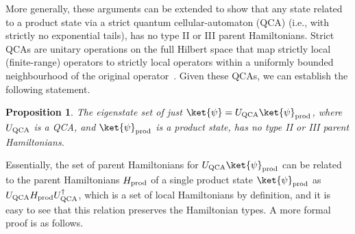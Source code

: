 \documentclass[prx,letterpaper,aps,superscriptaddress,floatfix,twocolumn,nofootinbib]{revtex4-2}
\newtheorem{prop}{Proposition}
\theoremstyle{definition}
\begin{document}
%
More generally, these arguments can be extended to show that any state related to a product state via a strict quantum cellular-automaton (QCA) (i.e., with strictly no exponential tails), has no type II or III parent Hamiltonians.
%
Strict QCAs are unitary operations on the full Hilbert space that map strictly local (finite-range) operators to strictly local operators within a uniformly bounded neighbourhood of the original operator~\cite{SchumacherWerner2004,FreedmanHastings2020,HaahFidkowskiHastings2022,Farrelly2020Review}.
%
Given these QCAs, we can establish the following statement.
%
\begin{prop}
\label{prop:QCA}
    The eigenstate set of just $\ket{\psi}=U_{\rm QCA}\ket{\psi}_{\rm prod}$, where $U_{\rm QCA}$ is a QCA, and $\ket{\psi}_{\rm prod}$ is a product state, has no type II or III parent Hamiltonians.
\end{prop}
%
Essentially, the set of parent Hamiltonians for $U_{\rm QCA}\ket{\psi}_{\rm prod}$ can be related to the parent Hamiltonians $H_{\rm prod}$ of a single product state $\ket{\psi}_{\rm prod}$ as $U_{\rm QCA} H_{\rm prod} U_{\rm QCA}^\dagger$, which is a set of local Hamiltonians by definition, and it is easy to see that this relation preserves the Hamiltonian types.
%
A more formal proof is as follows.
%
\end{document}
